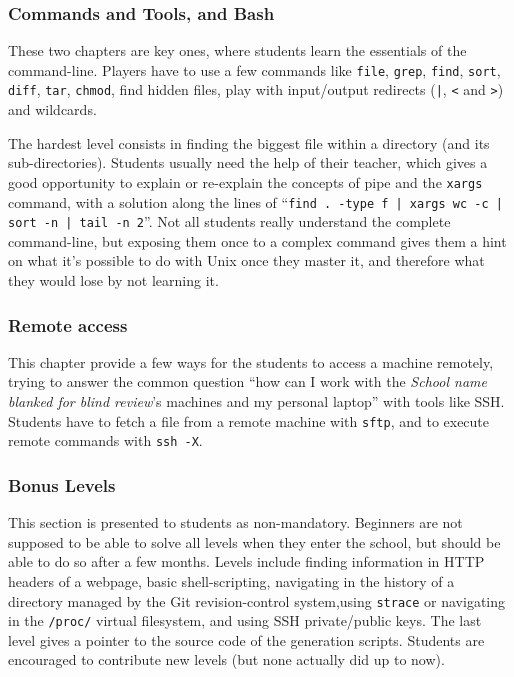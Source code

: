 \documentclass{sig-alternate}
\newcommand{\ensimag}[0]{\textit{School name blanked for blind review}}
\newcommand{\ensimag}[0]{Ensimag}
\begin{document}
\subsubsection{Commands and Tools, and Bash}
These two chapters are key ones, where students learn the essentials
of the command-line. Players have to use a few commands like
\texttt{file}, \texttt{grep}, \texttt{find}, \texttt{sort},
\texttt{diff}, \texttt{tar}, \texttt{chmod}, find hidden files, play
with input/output redirects (\verb+|+, \verb+<+ and \verb+>+) and
wildcards.

The hardest level consists in finding the biggest file within a
directory (and its sub-directories). Students usually need the help of
their teacher, which gives a good opportunity to explain or re-explain
the concepts of pipe and the \texttt{xargs} command, with a solution
along the lines of ``\texttt{find . -type f | xargs wc -c | sort -n |
  tail -n 2}''. Not all students really understand the complete
command-line, but exposing them once to a complex command gives them a
hint on what it's possible to do with Unix once they master it, and
therefore what they would lose by not learning it.

\subsubsection{Remote access}
This chapter provide a few ways for the students to access a machine
remotely, trying to answer the common question ``how can I work with
the \ensimag{}'s machines and my personal laptop'' with tools like SSH.
Students have to fetch a file from a remote machine with
\texttt{sftp}, and to execute remote commands with \texttt{ssh -X}.

\subsubsection{Bonus Levels}
This section is presented to students as non-mandatory. Beginners are
not supposed to be able to solve all levels when they enter the
school, but should be able to do so after a few months. Levels include
finding information in HTTP headers of a webpage, basic
shell-scripting, navigating in the history of a directory managed by
the Git revision-control system,using \texttt{strace} or
navigating in the \texttt{/proc/} virtual filesystem, and using SSH
private/public keys. The last level gives a pointer to the source code
of the generation scripts. Students are encouraged to contribute new
levels (but none actually did up to now).
\end{document}
